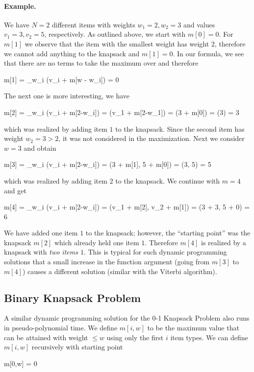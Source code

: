 \paragraph{Example.}  We have $N = 2$ different items with weights $w_1 = 2, w_2 = 3$ and values $v_1 = 3, v_2 = 5$, respectively. As outlined above, we start with $m[0] = 0$. For $m[1]$ we observe that the item with the smallest weight has weight $2$, therefore we cannot add anything to the knapsack and $m[1] = 0$. In our formula, we see that there are no terms to take the maximum over and therefore

\bee
m[1] = \max_{w_i }(v_i + m[w - w_i]) = 0
\eee

The next one is more interesting, we have

\bee
m[2] = \max_{w_i } (v_i + m[2-w_i]) = \max(v_1 + m[2-w_1]) = \max(3 + m[0]) = \max(3) = 3
\eee

which was realized by adding item $1$ to the knapsack. Since the second item has weight $w_2 = 3 > 2$, it was not considered in the maximization. Next we consider $w=3$ and obtain

\bee
m[3] = \max_{w_i } (v_i + m[2-w_i]) = \max(3 + m[1], 5 + m[0]) = \max(3, 5) = 5
\eee

which was realized by adding item $2$ to the knapsack. We continue with $m=4$ and get

\bee
m[4] = \max_{w_i } (v_i + m[2-w_i]) = \max(v_1 + m[2], v_2 + m[1]) = \max(3 + 3, 5 + 0) = 6
\eee

We have added one item $1$ to the knapsack; however, the ``starting point'' was the knapsack $m[2]$ which already held one item $1$. Therefore $m[4]$ is realized by a knapsack with \emph{two items $1$}. This is typical for such dynamic programming solutions that a small increase in the function argument (going from $m[3]$ to $m[4]$) causes a different solution (similar with the Viterbi algorithm).


\subsection{Binary Knapsack Problem}

A similar dynamic programming solution for the 0-1 Knapsack Problem also runs in pseudo-polynomial time. We define $m[i,w]$  to be the maximum value that can be attained with weight $\leq w$ using only the first $i$ item types. We can define $m[i,w]$ recursively with starting point

\bee
m[0,w]  = 0
\eee

